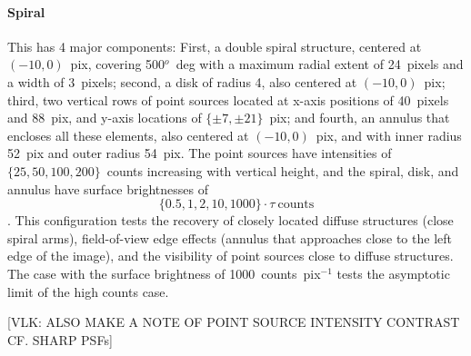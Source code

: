 \documentclass[twocolumn]{aastex631}
\newcommand{\vlk}[1]{{\color{blue} [VLK: #1]}}
\begin{document}
    \paragraph{Spiral} This has 4 major components: First, a double spiral structure, centered at $(-10, 0)$~pix, covering 500$^o$~deg with a maximum radial extent of 24~pixels and a width of 3~pixels; second, a disk of radius 4, also centered at $(-10, 0)$~pix; third, two vertical rows of point sources located at x-axis positions of 40~pixels and 88~pix, and y-axis locations of $\{\pm7,\pm21\}$~pix; and fourth, an annulus that encloses all these elements, also centered at $(-10, 0)$~pix, and with inner radius 52~pix and outer radius 54~pix.  
    The point sources have intensities of $\{25, 50, 100, 200\}$~counts increasing with vertical height, and the spiral, disk, and annulus have surface brightnesses of $$\{0.5, 1, 2, 10, 1000\} \cdot \tau ~\textrm{counts}$$.  This configuration tests the recovery of closely located diffuse structures (close spiral arms), field-of-view edge effects (annulus that approaches close to the left edge of the image), and the visibility of point sources close to diffuse structures.  The case with the surface brightness of 1000~counts~pix$^{-1}$ tests the asymptotic limit of the high counts case.
    
    \vlk{ALSO MAKE A NOTE OF POINT SOURCE INTENSITY CONTRAST CF. SHARP PSFs}


\end{document}
